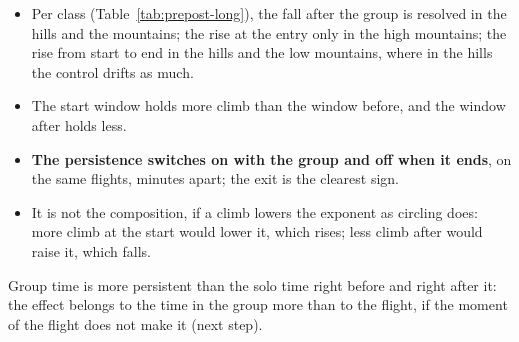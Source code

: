 \documentclass[10pt,a4paper]{article}
\newcommand{\Home}{\item[\textcolor{answer}{\textbf{Take home.}}]\color{black}}
\newcommand{\Ded}{\item[\textcolor{answer}{\textbf{Deduction.}}]\color{black}}
\newenvironment{step}{\begin{description}[leftmargin=0pt, itemsep=7pt, topsep=8pt]}{\end{description}}
\begin{document}
\begin{step}
\begin{itemize}
    to about the level before; the fall is far outside the control.
  \item Per class (Table~\ref{tab:prepost-long}), the fall after the group is resolved in the hills and the
    mountains; the rise at the entry only in the high mountains; the rise from start to end in the hills and the
    low mountains, where in the hills the control drifts as much.
  \item The start window holds more climb than the window before, and the window after holds less.
  \end{itemize}
\Ded\mbox{}
  \begin{itemize}
  \item \textbf{The persistence switches on with the group and off when it ends}, on the same flights, minutes
    apart; the exit is the clearest sign.
  \item It is not the composition, if a climb lowers the exponent as circling does: more climb at the start would
    lower it, which rises; less climb after would raise it, which falls.
  \end{itemize}
\Home Group time is more persistent than the solo time right before and right after it: the effect belongs to the
  time in the group more than to the flight, if the moment of the flight does not make it (next step).
\end{step}
\end{document}
